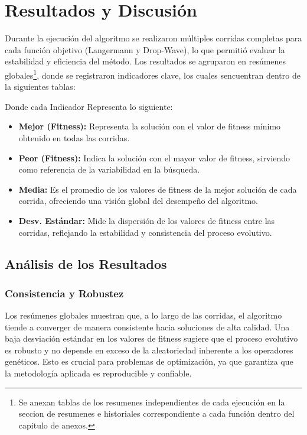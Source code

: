 \chapter{Resultados y Discusi\'on}

Durante la ejecuci\'on del algoritmo se realizaron m\'ultiples corridas completas para cada funci\'on objetivo (Langermann y Drop-Wave), lo que permiti\'o evaluar la estabilidad y eficiencia del m\'etodo. Los resultados se agruparon en res\'umenes globales\footnote{Se anexan tablas de los resumenes independientes de cada ejecución en la seccion de resumenes e historiales correspondiente a cada función dentro del capitulo de anexos.}, donde se registraron indicadores clave, los cuales sencuentran dentro de la siguientes tablas:



Donde cada Indicador Representa lo siguiente:
\begin{itemize}
    \item \textbf{Mejor (Fitness):} Representa la soluci\'on con el valor de fitness m\'inimo obtenido en todas las corridas.
    \item \textbf{Peor (Fitness):} Indica la soluci\'on con el mayor valor de fitness, sirviendo como referencia de la variabilidad en la b\'usqueda.
    \item \textbf{Media:} Es el promedio de los valores de fitness de la mejor soluci\'on de cada corrida, ofreciendo una visi\'on global del desempe\~no del algoritmo.
    \item \textbf{Desv. Est\'andar:} Mide la dispersi\'on de los valores de fitness entre las corridas, reflejando la estabilidad y consistencia del proceso evolutivo.
\end{itemize}

\section{An\'alisis de los Resultados}

\subsection{Consistencia y Robustez}
Los res\'umenes globales muestran que, a lo largo de las corridas, el algoritmo tiende a converger de manera consistente hacia soluciones de alta calidad. Una baja desviaci\'on est\'andar en los valores de fitness sugiere que el proceso evolutivo es robusto y no depende en exceso de la aleatoriedad inherente a los operadores gen\'eticos. Esto es crucial para problemas de optimizaci\'on, ya que garantiza que la metodolog\'ia aplicada es reproducible y confiable.

